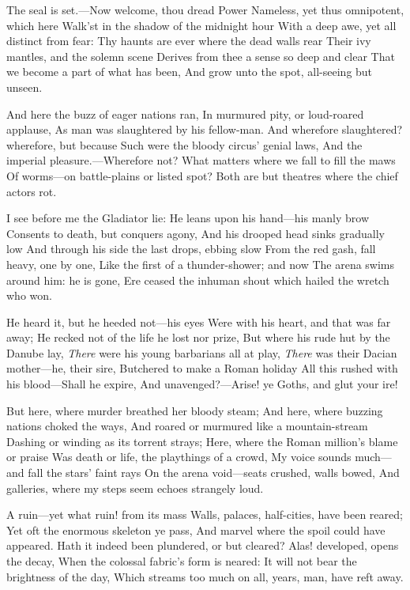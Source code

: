 \documentclass[10pt,twocolumn]{book}
\begin{document}
   The seal is set.---Now welcome, thou dread Power
   Nameless, yet thus omnipotent, which here
   Walk'st in the shadow of the midnight hour
   With a deep awe, yet all distinct from fear:
   Thy haunts are ever where the dead walls rear
   Their ivy mantles, and the solemn scene
   Derives from thee a sense so deep and clear
   That we become a part of what has been,
And grow unto the spot, all-seeing but unseen.


   And here the buzz of eager nations ran,
   In murmured pity, or loud-roared applause,
   As man was slaughtered by his fellow-man.
   And wherefore slaughtered? wherefore, but because
   Such were the bloody circus' genial laws,
   And the imperial pleasure.---Wherefore not?
   What matters where we fall to fill the maws
   Of worms---on battle-plains or listed spot?
Both are but theatres where the chief actors rot.


   I see before me the Gladiator lie:
   He leans upon his hand---his manly brow
   Consents to death, but conquers agony,
   And his drooped head sinks gradually low\textemdash
   And through his side the last drops, ebbing slow
   From the red gash, fall heavy, one by one,
   Like the first of a thunder-shower; and now
   The arena swims around him:  he is gone,
Ere ceased the inhuman shout which hailed the wretch who won.


   He heard it, but he heeded not---his eyes
   Were with his heart, and that was far away;
   He recked not of the life he lost nor prize,
   But where his rude hut by the Danube lay,
   \textit{There} were his young barbarians all at play,
   \textit{There} was their Dacian mother---he, their sire,
   Butchered to make a Roman holiday\textemdash
   All this rushed with his blood---Shall he expire,
And unavenged?---Arise! ye Goths, and glut your ire!


   But here, where murder breathed her bloody steam;
   And here, where buzzing nations choked the ways,
   And roared or murmured like a mountain-stream
   Dashing or winding as its torrent strays;
   Here, where the Roman million's blame or praise
   Was death or life, the playthings of a crowd,
   My voice sounds much---and fall the stars' faint rays
   On the arena void---seats crushed, walls bowed,
And galleries, where my steps seem echoes strangely loud.


   A ruin---yet what ruin! from its mass
   Walls, palaces, half-cities, have been reared;
   Yet oft the enormous skeleton ye pass,
   And marvel where the spoil could have appeared.
   Hath it indeed been plundered, or but cleared?
   Alas! developed, opens the decay,
   When the colossal fabric's form is neared:
   It will not bear the brightness of the day,
Which streams too much on all, years, man, have reft away.
\end{document}
